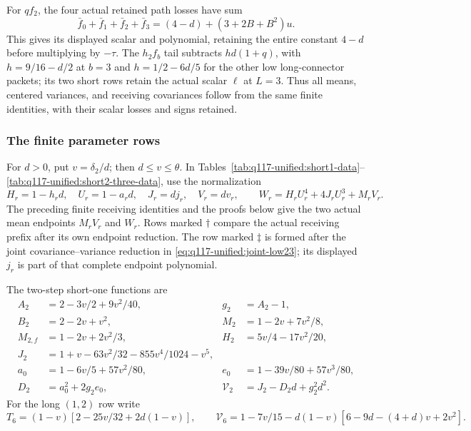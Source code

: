 For \(qf_2\), the four actual retained path losses have sum
\[
 \bar f_0+\bar f_1+\bar f_2+\bar f_3
 =(4-d)+(3+2B+B^2)u.
\]
This gives its displayed scalar and polynomial, retaining the entire
constant \(4-d\) before multiplying by \(-\tau\).
The \(h_2f_b\) tail subtracts
\(hd(1+q)\), with \(h=9/16-d/2\) at \(b=3\) and
\(h=1/2-6d/5\) for the other low long-connector packets;
its two short rows retain the actual scalar
\(\ell\) at \(L=3\). Thus all means, centered variances, and
receiving covariances follow from the same finite identities, with
their scalar losses and signs retained.

\subsubsection{The finite parameter rows}
\label{sec:q117-unified:row-data}

For \(d>0\), put \(v=\delta_2/d\); then
\(d\le v\le\theta\). In Tables~\ref{tab:q117-unified:short1-data}--
\ref{tab:q117-unified:short2-three-data}, use the normalization
\begin{equation}\label{eq:q117-unified:normalized-data}
 H_r=1-h_rd,\quad U_r=1-a_rd,\quad J_r=dj_r,\quad V_r=dv_r,
 \qquad
 W_r=H_rU_r^4+4J_rU_r^3+M_rV_r.
\end{equation}
The preceding finite receiving identities and the proofs below
give the two actual mean endpoints \(M_rV_r\) and \(W_r\).
Rows marked \(\dagger\) compare the actual receiving prefix after
its own endpoint reduction. The row marked \(\ddagger\) is formed
after the joint covariance--variance reduction in
\eqref{eq:q117-unified:joint-low23}; its displayed \(j_r\) is part
of that complete endpoint polynomial.

The two-step short-one functions are
\begin{equation}\label{eq:q117-unified:two-step-data}
\begin{aligned}
 A_2&=2-3v/2+9v^2/40,& g_2&=A_2-1,\\
 B_2&=2-2v+v^2,& M_2&=1-2v+7v^2/8,\\
 M_{2,f}&=1-2v+2v^2/3,& H_2&=5v/4-17v^2/20,\\
 J_2&=1+v-63v^2/32-855v^4/1024-v^5,\\
 a_0&=1-6v/5+57v^2/80,& e_0&=1-39v/80+57v^3/80,\\
 D_2&=a_0^2+2g_2e_0,&
 \mathcal V_2&=J_2-D_2d+g_2^2d^2.
\end{aligned}
\end{equation}
For the long \((1,2)\) row write
\[
 T_6=(1-v)[2-25v/32+2d(1-v)],\qquad
 \mathcal V_6=1-7v/15-d(1-v)[6-9d-(4+d)v+2v^2].
\]

